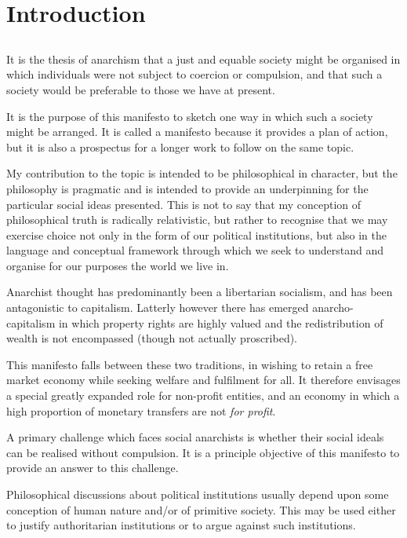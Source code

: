 
\section{Introduction}\label{Introduction}

\subsection{}

It is the thesis of anarchism that a just and equable society might be organised in which individuals were not subject to coercion or compulsion, and that such a society would be preferable to those we have at present.

It is the purpose of this manifesto to sketch one way in which such a society might be arranged.
It is called a manifesto because it provides a plan of action, but it is also a prospectus for a longer work to follow on the same topic.

My contribution to the topic is intended to be philosophical in character, but the philosophy is pragmatic and is intended to provide an underpinning for the particular social ideas presented.
This is not to say that my conception of philosophical truth is radically relativistic, but rather to recognise that we may exercise choice not only in the form of our political institutions, but also in the language and conceptual framework through which we seek to understand and organise for our purposes the world we live in.

Anarchist thought has predominantly been a libertarian socialism, and has been antagonistic to capitalism.
Latterly however there has emerged anarcho-capitalism in which property rights are highly valued and the redistribution of wealth is not encompassed (though not actually proscribed).

This manifesto falls between these two traditions, in wishing to retain a free market economy while seeking welfare and fulfilment for all.
It therefore envisages a special greatly expanded role for non-profit entities, and an economy in which a high proportion of monetary transfers are not {\it for profit}.

A primary challenge which faces social anarchists is whether their social ideals can be realised without compulsion.
It is a principle objective of this manifesto to provide an answer to this challenge.

Philosophical discussions about political institutions usually depend upon some conception of human nature and/or of primitive society.
This may be used either to justify authoritarian institutions or to argue against such institutions.

